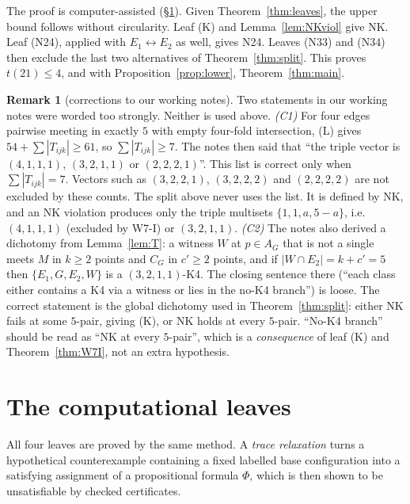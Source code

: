\documentclass[11pt]{amsart}
\theoremstyle{definition}
\newtheorem{remark}[theorem]{Remark}
\begin{document}
The proof is computer-assisted (\S\ref{sec:leaves}). Given Theorem~\ref{thm:leaves}, the upper bound follows without circularity. Leaf (K) and Lemma~\ref{lem:NKviol} give NK. Leaf (N24), applied with $E_1\leftrightarrow E_2$ as well, gives N24. Leaves (N33) and (N34) then exclude the last two alternatives of Theorem~\ref{thm:split}. This proves $t(21)\le 4$, and with Proposition~\ref{prop:lower}, Theorem~\ref{thm:main}.

\begin{remark}[corrections to our working notes]\label{rem:C1C2}
Two statements in our working notes were worded too strongly. Neither is used above.
\emph{(C1)} For four edges pairwise meeting in exactly $5$ with empty four-fold intersection, (L) gives $54+\sum|T_{ijk}|\ge 61$, so $\sum|T_{ijk}|\ge 7$. The notes then said that ``the triple vector is $(4,1,1,1)$, $(3,2,1,1)$ or $(2,2,2,1)$''. This list is correct only when $\sum|T_{ijk}|=7$. Vectors such as $(3,2,2,1)$, $(3,2,2,2)$ and $(2,2,2,2)$ are not excluded by these counts. The split above never uses the list. It is defined by NK, and an NK violation produces only the triple multisets $\{1,1,a,5-a\}$, i.e.\ $(4,1,1,1)$ (excluded by W7-I) or $(3,2,1,1)$.
\emph{(C2)} The notes also derived a dichotomy from Lemma~\ref{lem:T}: a witness $W$ at $p\in A_G$ that is not a single meets $M$ in $k\ge 2$ points and $C_G$ in $c'\ge 2$ points, and if $|W\cap E_2|=k+c'=5$ then $\{E_1,G,E_2,W\}$ is a $(3,2,1,1)$-K4. The closing sentence there (``each class either contains a K4 via a witness or lies in the no-K4 branch'') is loose. The correct statement is the global dichotomy used in Theorem~\ref{thm:split}: either NK fails at some $5$-pair, giving (K), or NK holds at every $5$-pair. ``No-K4 branch'' should be read as ``NK at every $5$-pair'', which is a \emph{consequence} of leaf (K) and Theorem~\ref{thm:W7I}, not an extra hypothesis.
\end{remark}

\section{The computational leaves}\label{sec:leaves}

All four leaves are proved by the same method. A \emph{trace relaxation} turns a hypothetical counterexample containing a fixed labelled base configuration into a satisfying assignment of a propositional formula $\Phi$, which is then shown to be unsatisfiable by checked certificates.
\end{document}
